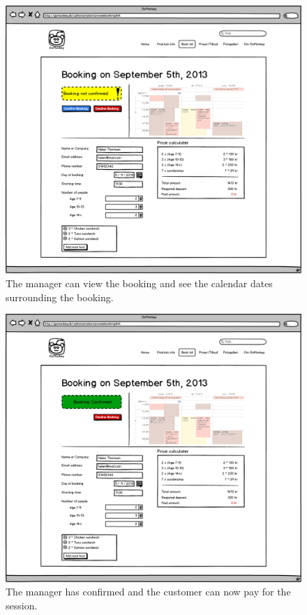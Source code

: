 \begin{figure}[htbp]
    \centering
        \includegraphics[width=.8\textwidth]{figures/mockup/admin_booking.png}
	    \caption{The manager can view the booking and see the calendar dates surrounding the booking.}
        \label{fig:admin}
\end{figure}
\begin{figure}[htbp]
    \centering
        \includegraphics[width=.8\textwidth]{figures/mockup/admin_booking_confirmed.png}
	    \caption{The manager has confirmed and the customer can now pay for the session.}
        \label{fig:adminconfirmed}
\end{figure}
